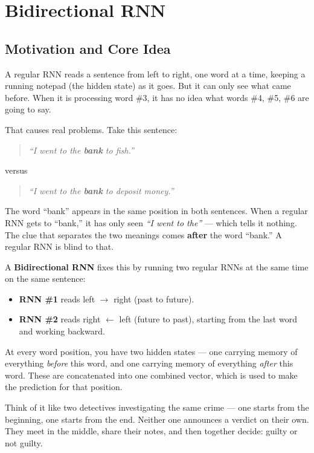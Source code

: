\documentclass[12pt,a4paper]{article}
\begin{document}
\section{Bidirectional RNN}

\subsection{Motivation and Core Idea}

A regular RNN reads a sentence from left to right, one word at a time, keeping a running notepad (the hidden state) as it goes. But it can only see what came before. When it is processing word \#3, it has no idea what words \#4, \#5, \#6 are going to say.

That causes real problems. Take this sentence:

\begin{quote}
\textit{``I went to the \textbf{bank} to fish.''}
\end{quote}

versus

\begin{quote}
\textit{``I went to the \textbf{bank} to deposit money.''}
\end{quote}

The word ``bank'' appears in the same position in both sentences. When a regular RNN gets to ``bank,'' it has only seen \textit{``I went to the''} --- which tells it nothing. The clue that separates the two meanings comes \textbf{after} the word ``bank.'' A regular RNN is blind to that.

A \textbf{Bidirectional RNN} fixes this by running two regular RNNs at the same time on the same sentence:

\begin{itemize}
    \item \textbf{RNN \#1} reads left $\rightarrow$ right (past to future).
    \item \textbf{RNN \#2} reads right $\leftarrow$ left (future to past), starting from the last word and working backward.
\end{itemize}

At every word position, you have two hidden states --- one carrying memory of everything \textit{before} this word, and one carrying memory of everything \textit{after} this word. These are concatenated into one combined vector, which is used to make the prediction for that position.

Think of it like two detectives investigating the same crime --- one starts from the beginning, one starts from the end. Neither one announces a verdict on their own. They meet in the middle, share their notes, and then together decide: guilty or not guilty.
\end{document}
